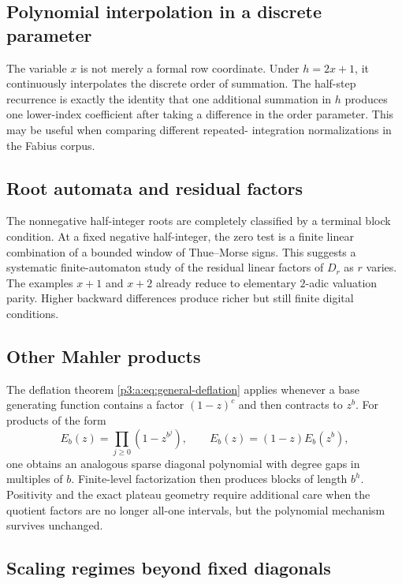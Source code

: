 \documentclass[11pt,oneside]{article}
\numberwithin{equation}{section}
\theoremstyle{definition}
\theoremstyle{remark}
\begin{document}
\subsection{Polynomial interpolation in a discrete parameter}

The variable \(x\) is not merely a formal row coordinate.  Under
\(h=2x+1\), it continuously interpolates the discrete order of summation.  The
half-step recurrence is exactly the identity that one additional summation in
\(h\) produces one lower-index coefficient after taking a difference in the
order parameter.  This may be useful when comparing different repeated-
integration normalizations in the Fabius corpus.

\subsection{Root automata and residual factors}

The nonnegative half-integer roots are completely classified by a terminal
block condition.  At a fixed negative half-integer, the zero test is a finite
linear combination of a bounded window of Thue--Morse signs.  This suggests a
systematic finite-automaton study of the residual linear factors of
\(D_r\) as \(r\) varies.  The examples \(x+1\) and \(x+2\) already reduce
to elementary \(2\)-adic valuation parity.  Higher backward differences
produce richer but still finite digital conditions.

\subsection{Other Mahler products}

The deflation theorem \eqref{p3:a:eq:general-deflation} applies whenever a base
generating function contains a factor \((1-z)^c\) and then contracts to
\(z^b\).  For products of the form
\[
 E_b(z)=\prod_{j\ge0}(1-z^{b^j}),
 \qquad
 E_b(z)=(1-z)E_b(z^b),
\]
one obtains an analogous sparse diagonal polynomial with degree gaps in
multiples of \(b\).  Finite-level factorization then produces blocks of length
\(b^h\).  Positivity and the exact plateau geometry require additional care
when the quotient factors are no longer all-one intervals, but the polynomial
mechanism survives unchanged.
\subsection{Scaling regimes beyond fixed diagonals}
\end{document}
